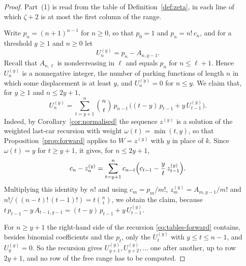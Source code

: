 \documentclass{amsart}
\theoremstyle{definition}
\theoremstyle{remark}
\numberwithin{equation}{section}
\begin{document}
\begin{proof}
Part~(1) is read from the table of Definition~\ref{def:zeta}, in each line of which $\zeta+2$ is at most the first column of the range.

Write $p_n=(n+1)^{n-1}$ for $n\ge 0$, so that $p_0=1$ and $p_n=n!\,c_n$, and for a threshold $y\ge 1$ and $n\ge 0$ let
\[
U^{(y)}_n=p_n-A_{n,y-1}.
\]
Recall that $A_{n,\ell}$ is nondecreasing in $\ell$ and equals $p_n$ for $n\le\ell+1$. Hence $U^{(y)}_n$ is a nonnegative integer, the number of parking functions of length $n$ in which some displacement is at least $y$, and $U^{(y)}_n=0$ for $n\le y$. We claim that, for $y\ge 1$ and $n\le 2y+1$,
\begin{equation}\label{eq:tables-forward}
U^{(y)}_n=\sum_{t=y+1}^{n}\binom{n}{t}\,p_{n-t}\,\bigl((t-y)\,p_{t-1}+y\,U^{(y)}_{t-1}\bigr).
\end{equation}
Indeed, by Corollary~\ref{cor:normalised} the sequence $z^{(y)}$ is a solution of the weighted last-car recursion with weight $\omega(t)=\min(t,y)$, so that Proposition~\ref{prop:forward} applies to $W=z^{(y)}$ with $y$ in place of $k$. Since $\omega(t)=y$ for $t\ge y+1$, it gives, for $n\le 2y+1$,
\[
c_n-z^{(y)}_n=\sum_{t=y+1}^{n}c_{n-t}\Bigl(c_{t-1}-\frac{y}{t}\,z^{(y)}_{t-1}\Bigr).
\]
Multiplying this identity by $n!$ and using $c_m=p_m/m!$, $z^{(y)}_m=A_{m,y-1}/m!$ and $n!/((n-t)!\,(t-1)!)=t\binom{n}{t}$, we obtain the claim, because $t\,p_{t-1}-y\,A_{t-1,y-1}=(t-y)\,p_{t-1}+y\,U^{(y)}_{t-1}$.

For $n\ge y+1$ the right-hand side of the recursion \eqref{eq:tables-forward} contains, besides binomial coefficients and the $p_t$, only the $U^{(y)}_t$ with $y\le t\le n-1$, and $U^{(y)}_y=0$. So the recursion gives $U^{(y)}_{y+1},U^{(y)}_{y+2},\dots$ one after another, up to row $2y+1$, and no row of the free range has to be computed.


\end{proof}
\end{document}
